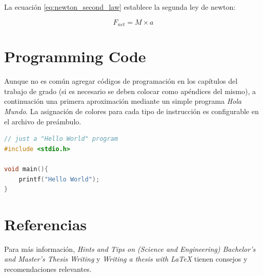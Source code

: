La ecuación \ref{eq:newton_second_law} establece la segunda ley de newton:

\begin{equation}
    F_{net} = M \times a
\label{eq:newton_second_law}
\end{equation}

\section{Programming Code}

Aunque no es común agregar códigos de programación en los capítulos del trabajo de grado (si es necesario se deben colocar como apéndices del mismo), a continuación una primera aproximación mediante un simple programa \textit{Hola Mundo}. La asignación de colores para cada tipo de instrucción es configurable en el archivo de preámbulo.

\begin{lstlisting}[language=C]
// just a "Hello World" program
#include <stdio.h>

void main(){
    printf("Hello World");
}
\end{lstlisting}

\section{Referencias}

Para más información, \textit{Hints and Tips on (Science and Engineering) Bachelor’s and Master’s Thesis Writing} \cite{Thesis_LaTeX_2} y \textit{Writing a thesis with LaTeX} \cite{Thesis_LaTeX} tienen consejos y recomendaciones relevantes.
